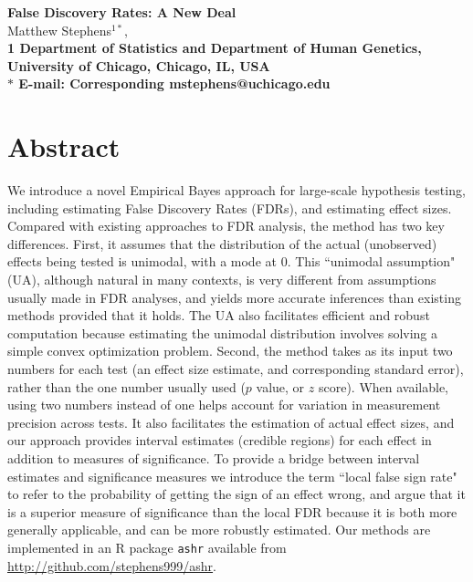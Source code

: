 \documentclass[11pt]{article}
\date{}
\begin{document}
\begin{flushleft}
{\Large
\textbf{False Discovery Rates: A New Deal}
}
\\
Matthew Stephens$^{1*}$, 
\\
\bf{1} Department of Statistics and Department of Human Genetics, University of Chicago, Chicago, IL, USA
\\
$\ast$ E-mail: Corresponding mstephens@uchicago.edu
\end{flushleft}

\section*{Abstract}

We introduce a novel Empirical Bayes approach for large-scale hypothesis testing, including  
estimating False Discovery Rates (FDRs), and estimating effect sizes. Compared with
existing approaches to FDR analysis, the method has two key differences. First, it
assumes that the distribution of the actual (unobserved) effects being tested is unimodal, with a mode at 0.
This ``unimodal assumption" (UA), although natural in many contexts, is very different from assumptions usually made
in FDR analyses, and yields more accurate inferences than existing methods provided that it holds.
The UA also facilitates efficient and robust computation because estimating the unimodal distribution involves solving a simple convex optimization problem.
Second, the method takes as its input two numbers for each test (an effect size estimate, and corresponding standard error),
rather than the one number usually used ($p$ value, or $z$ score). When available, using two numbers instead of one 
helps account for variation in measurement precision across tests. It also facilitates the estimation of actual 
effect sizes, and our approach provides interval estimates (credible regions) for each effect in addition to measures of significance.
To provide a bridge between interval estimates and significance measures we introduce the term ``local false sign rate"
to refer to the probability of getting the sign of an effect wrong, and argue that it is a superior
measure of significance than the local FDR because it is both more generally applicable, and
can be more robustly estimated. Our methods are implemented in an R package {\tt ashr}
available from \href{http://github.com/stephens999/ashr}{http://github.com/stephens999/ashr}. 
\end{document}
